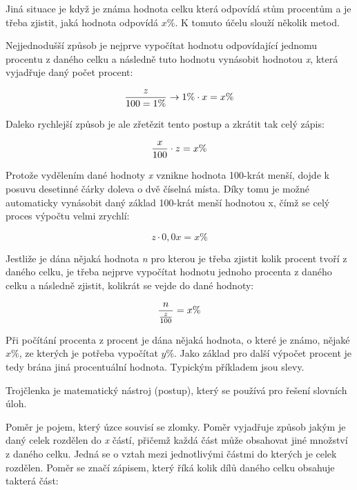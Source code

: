 Jiná situace je když je známa hodnota celku která odpovídá stům procentům a je třeba zjistit, jaká hodnota odpovídá $x\%$.  K tomuto účelu slouží několik metod.

Nejjednodušší způsob je nejprve vypočítat hodnotu odpovídající jednomu procentu z daného celku a následně tuto hodnotu vynásobit hodnotou {\it x}, která vyjadřuje daný počet procent:

$$ {z \over 100 = 1\%} \rightarrow 1\% \cdot x = x\%  $$

Daleko rychlejší způsob je ale zřetězit tento postup a zkrátit tak celý zápis:

$$ {x\over 100}\cdot z = x\% $$

Protože vydělením dané hodnoty {\it x} vznikne hodnota 100-krát menší, dojde k posuvu desetinné čárky doleva o dvě číselná místa. Díky tomu je možné automaticky vynásobit daný základ 100-krát menší hodnotou x, čímž se celý proces výpočtu velmi zrychlí:

$$ z \cdot 0,0x = x\% $$

Jestliže je dána nějaká hodnota {\it n} pro kterou je třeba zjistit kolik procent tvoří z daného celku, je třeba nejprve vypočítat hodnotu jednoho procenta z daného celku a následně zjistit, kolikrát se vejde do dané hodnoty:

$$ {n\over {z\over 100}} = x\% $$


Při počítání procenta z procent je dána nějaká hodnota, o které je známo, nějaké $x\%$,  ze kterých je potřeba vypočítat $y\%$. Jako základ pro další výpočet procent je tedy brána jiná procentuální hodnota. Typickým příkladem jsou slevy.



\vskip 4mm
\vskip 4mm


Trojčlenka je matematický nástroj (postup), který se používá pro řešení slovních úloh.


Poměr je pojem, který úzce souvisí se zlomky. Poměr vyjadřuje způsob jakým je daný celek rozdělen do {\it x} částí, přičemž každá část může obsahovat jiné množství z daného celku. Jedná se o vztah mezi jednotlivými částmi do kterých je celek rozdělen. Poměr se značí zápisem, který říká kolik dílů daného celku obsahuje takterá část:

